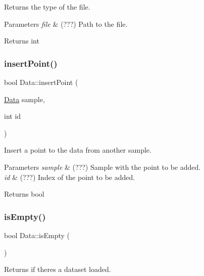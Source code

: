 Returns the type of the file. 


\begin{DoxyParams}{Parameters}
{\em file} & (???) Path to the file. \\
\hline
\end{DoxyParams}
\begin{DoxyReturn}{Returns}
int 
\end{DoxyReturn}
\mbox{\label{class_data_abb6aade47d78a284301c32e82b2cbee2}} 
\subsubsection{\texorpdfstring{insert\+Point()}{insertPoint()}}
{\footnotesize\ttfamily bool Data\+::insert\+Point (\begin{DoxyParamCaption}\item[{\hyperlink{class_data}{Data}}]{sample,  }\item[{int}]{id }\end{DoxyParamCaption})}



Insert a point to the data from another sample. 


\begin{DoxyParams}{Parameters}
{\em sample} & (???) Sample with the point to be added. \\
\hline
{\em id} & (???) Index of the point to be added. \\
\hline
\end{DoxyParams}
\begin{DoxyReturn}{Returns}
bool 
\end{DoxyReturn}
\mbox{\label{class_data_a93468d3b8b2ce0f73e369e5de160534e}} 
\subsubsection{\texorpdfstring{is\+Empty()}{isEmpty()}}
{\footnotesize\ttfamily bool Data\+::is\+Empty (\begin{DoxyParamCaption}{ }\end{DoxyParamCaption})}



Returns if there\textquotesingle{}s a dataset loaded. 

